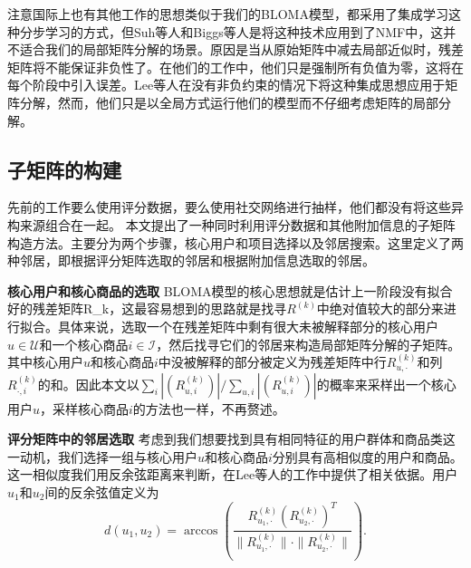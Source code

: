 注意国际上也有其他工作\cite{biggs2008nonnegative,ensnmf,li2018multi}的思想类似于我们的BLOMA模型，都采用了集成学习这种分步学习的方式，但Suh等人\cite{ensnmf}和Biggs等人\cite{biggs2008nonnegative}是将这种技术应用到了NMF中，这并不适合我们的局部矩阵分解的场景。原因是当从原始矩阵中减去局部近似时，残差矩阵将不能保证非负性了。在他们的工作中，他们只是强制所有负值为零，这将在每个阶段中引入误差。Lee等人在没有非负约束的情况下将这种集成思想应用于矩阵分解，然而，他们只是以全局方式运行他们的模型而不仔细考虑矩阵的局部分解。

\subsection{子矩阵的构建}
先前的工作要么使用评分数据，要么使用社交网络进行抽样，他们都没有将这些异构来源组合在一起。 本文提出了一种同时利用评分数据和其他附加信息的子矩阵构造方法。主要分为两个步骤，核心用户和项目选择以及邻居搜索。这里定义了两种邻居，即根据评分矩阵选取的邻居和根据附加信息选取的邻居。

\vspace{3mm}
\noindent\textbf{核心用户和核心商品的选取}
BLOMA模型的核心思想就是估计上一阶段没有拟合好的残差矩阵\gls{R_k}，这最容易想到的思路就是找寻$R^{(k)}$中绝对值较大的部分来进行拟合。具体来说，选取一个在残差矩阵中剩有很大未被解释部分的核心用户$u \in \mathcal{U}$和一个核心商品$i \in \mathcal{I}$，然后找寻它们的邻居来构造局部矩阵分解的子矩阵。其中核心用户$u$和核心商品$i$中没被解释的部分被定义为残差矩阵中行$R_{u,\cdot}^{(k)}$和列$R_{\cdot,i}^{(k)}$的和。因此本文以$\sum_i|(R_{u,i}^{(k)})|/\sum_{u,i}|(R_{u,i}^{(k)})|$的概率来采样出一个核心用户$u$，采样核心商品$i$的方法也一样，不再赘述。

\vspace{3mm}
\noindent\textbf{评分矩阵中的邻居选取}
考虑到我们想要找到具有相同特征的用户群体和商品类这一动机，我们选择一组与核心用户$ u $和核心商品$ i $分别具有高相似度的用户和商品。这一相似度我们用反余弦距离来判断，在Lee等人\cite{lee2013local}的工作中提供了相关依据。用户$ u_1 $和$ u_2 $间的反余弦值定义为
\begin{equation}
\label{arc-cosine}
d(u_1,u_2) = \arccos(\frac{R_{u_1,\cdot}^{(k)} (R^{(k)}_{u_2,\cdot})^T}{\|R^{(k)}_{u_1,\cdot}\|\cdot\|R^{(k)}_{u_2,\cdot}\|}).
\end{equation}

